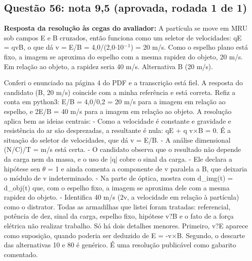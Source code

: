 \documentclass{article}%
\begin{document}
\subsection*{Questão 56: nota 9,5 (aprovada, rodada 1 de 1)}%
\textbf{Resposta da resolução às cegas do avaliador:} A partícula se move em MRU sob campos E e B cruzados, então funciona como um seletor de velocidades: qE = qvB, o que dá v = E/B = 4,0/(2,0$\cdot$10$^{-}$$^{1}$) = 20 m/s. Como o espelho plano está fixo, a imagem se aproxima do espelho com a mesma rapidez do objeto, 20 m/s. Em relação ao objeto, a rapidez seria 40 m/s. Alternativa B (20 m/s).\par %
Conferi o enunciado na página 4 do PDF e a transcrição está fiel. A resposta do candidato (B, 20 m/s) coincide com a minha referência e está correta. Refiz a conta em python3: E/B = 4,0/0,2 = 20 m/s para a imagem em relação ao espelho, e 2E/B = 40 m/s para a imagem em relação ao objeto.\newline%
\newline%
A resolução aplica bem as ideias centrais:\newline%
{-} Como a velocidade é constante e gravidade e resistência do ar são desprezadas, a resultante é nula: qE + q v$\times$B = 0. É a situação do seletor de velocidades, que dá v = E/B.\newline%
{-} A análise dimensional (N/C)/T = m/s está certa.\newline%
{-} O candidato observa que o resultado não depende da carga nem da massa, e o uso de |q| cobre o sinal da carga.\newline%
{-} Ele declara a hipótese sen $\theta$ = 1 e ainda comenta a componente de v paralela a B, que deixaria o módulo de v indeterminado.\newline%
{-} Na parte de óptica, mostra com d\_img(t) = d\_obj(t) que, com o espelho fixo, a imagem se aproxima dele com a mesma rapidez do objeto.\newline%
{-} Identifica 40 m/s (2v, a velocidade em relação à partícula) como o distrator.\newline%
\newline%
Todas as armadilhas que listei foram tratadas: referencial, potência de dez, sinal da carga, espelho fixo, hipótese v?B e o fato de a força elétrica não realizar trabalho. Só há dois detalhes menores. Primeiro, v?E aparece como suposição, quando poderia ser deduzido de E = -v$\times$B. Segundo, o descarte das alternativas 10 e 80 é genérico. É uma resolução publicável como gabarito comentado.%
\begin{itemize}%

\end{itemize}$$
\end{document}
